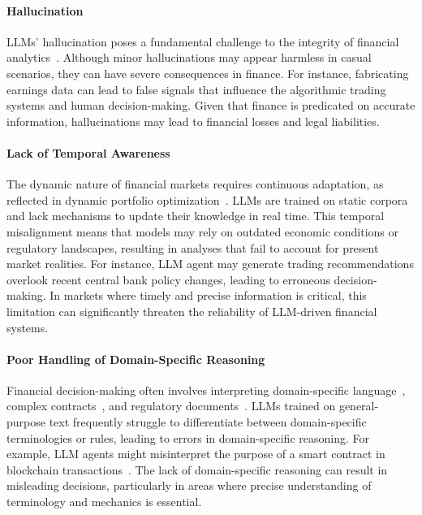 \paragraph{Hallucination}

LLMs' hallucination poses a fundamental challenge to the integrity of financial analytics~\citep{kang2023deficiency,roychowdhury2023hallucination}. 
Although minor hallucinations may appear harmless in casual scenarios, they can have severe consequences in finance. For instance, fabricating earnings data can lead to false signals that influence the algorithmic trading systems and human decision-making. Given that finance is predicated on accurate information, hallucinations may lead to financial losses and legal liabilities. 


\paragraph{Lack of Temporal Awareness}

The dynamic nature of financial markets requires continuous adaptation, as reflected in dynamic portfolio optimization~\citep{nystrup2018dynamic}. LLMs are trained on static corpora and lack mechanisms to update their knowledge in real time. This temporal misalignment means that models may rely on outdated economic conditions or regulatory landscapes, resulting in analyses that fail to account for present market realities. For instance, LLM agent may generate trading recommendations overlook recent central bank policy changes, leading to erroneous decision-making. In markets where timely and precise information is critical, this limitation can significantly threaten the reliability of LLM-driven financial systems.

\paragraph{Poor Handling of Domain-Specific Reasoning}

Financial decision-making often involves interpreting domain-specific language~\citep{ke2025demystifying}, complex contracts~\citep{lai2024large}, and regulatory documents~\citep{cao2024large}. LLMs trained on general-purpose text frequently struggle to differentiate between domain-specific terminologies or rules, leading to errors in domain-specific reasoning. For example, LLM agents might misinterpret the purpose of a smart contract in blockchain transactions~\citep{ressi2024ai}. The lack of domain-specific reasoning can result in misleading decisions, particularly in areas where precise understanding of terminology and mechanics is essential.


